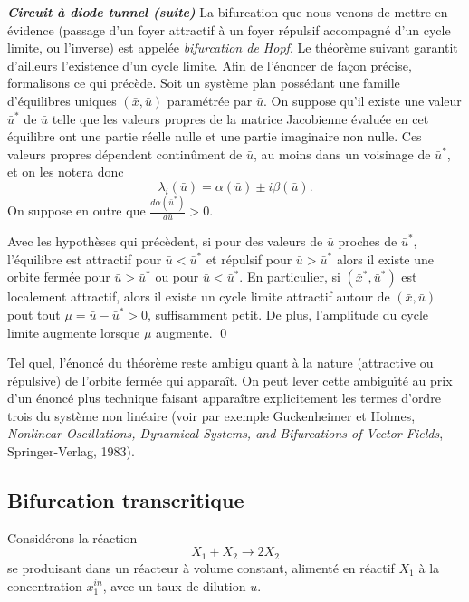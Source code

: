 \begin{exemple}{\bf \em Circuit {à} diode tunnel (suite)}
La bifurcation que nous venons de mettre en {é}vidence
(passage d'un foyer attractif {à} un foyer répulsif accompagn{é} d'un cycle limite, ou l'inverse) est
appel{é}e {\em bifurcation de Hopf}. Le th{é}or{è}me suivant garantit d'ailleurs
l'existence d'un cycle limite. Afin de l'{é}noncer de fa\c con pr{é}cise, formalisons ce qui pr{é}c{è}de.  Soit un syst{è}me plan poss{é}dant une famille d'{é}quilibres uniques $(\bar x, \bar u)$ param{é}tr{é}e par $\bar u$. On suppose qu'il existe une valeur $\bar u^*$ de $\bar u$ 
telle que les valeurs propres de la matrice Jacobienne évaluée en cet
 {é}quilibre ont une partie r{é}elle nulle et une partie imaginaire non nulle. Ces valeurs propres d{é}pendent contin{\^u}ment de $\bar u$, au moins dans un voisinage de $\bar u^*$, et on les notera donc $$\lambda_i(\bar u)=\alpha(\bar u)\pm i \beta(\bar u).$$ On suppose en outre que $\frac{d\alpha(\bar u^*)}{d\bar u}>0$.

\begin{theoreme}
Avec les hypoth{è}ses qui pr{é}c{è}dent, si pour des valeurs de
 $\bar u$ proches de $\bar u^*$, l'{é}quilibre est attractif 
 pour $\bar u <\bar u^*$ et répulsif pour $\bar u >\bar u^*$ alors il
  existe une orbite ferm{é}e pour $\bar u>\bar u^*$ ou pour $\bar u<\bar u^*$. 
  En particulier, si $(\bar x^*,\bar u^*)$ est localement
   attractif, alors il existe un cycle limite attractif autour de 
  $(\bar x,\bar u)$ pout tout $\mu=\bar u-\bar u^*>0$, suffisamment petit.
   De plus, l'amplitude du cycle limite augmente lorsque $\mu$ augmente.
   \qed
\end{theoreme}
   
\begin{remarque}
Tel quel, l'{é}nonc{é} du th{é}or{è}me reste 
ambigu quant {à} la nature (attractive ou r{é}pulsive) de l'orbite 
ferm{é}e qui apparaît. On peut lever cette ambiguïté au prix 
d'un {é}nonc{é} plus technique faisant apparaître explicitement 
les termes d'ordre trois du syst{è}me non lin{é}aire
(voir par exemple Guckenheimer et Holmes, 
{\em Nonlinear Oscillations, Dynamical Systems, and Bifurcations of Vector 
Fields}, Springer-Verlag, 1983). 
\end{remarque}

\subsection{Bifurcation transcritique}

Consid{é}rons  la r{é}action $$X_1
+ X_2 \rightarrow 2 X_2$$ se produisant dans un r{é}acteur {à} volume constant, aliment{é}
en r{é}actif $X_1$ {à} la concentration $x_1^{in}$, avec un taux de dilution $u$.


\end{exemple}
